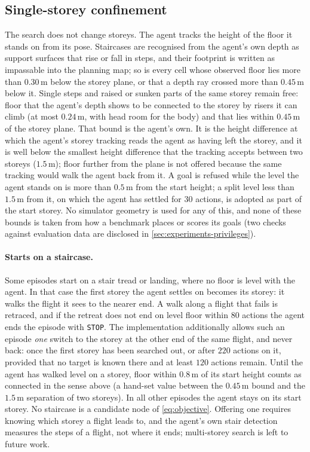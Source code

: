 \documentclass[10pt]{article}
\newcommand{\code}[1]{\texttt{#1}}
\newcommand{\m}{\,\mathrm{m}}
\begin{document}
\subsection{Single-storey confinement}\label{sec:storey}
The search does not change storeys. The agent tracks the height
of the floor it stands on from its pose. Staircases are recognised from the
agent's own depth as support surfaces that rise or fall in steps, and their
footprint is written as impassable into the planning map; so is every cell
whose observed floor lies more than $0.30\m$ below the storey plane, or that a
depth ray crossed more than $0.45\m$ below it. Single steps and raised or
sunken parts of the same storey remain free: floor that the agent's depth
shows to be connected to the storey by risers it can climb (at most
$0.24\m$, with head room for the body) and that lies within $0.45\m$ of the
storey plane. That bound is the agent's own. It is the height difference at
which the agent's storey tracking reads the agent as having left the storey,
and it is well below the smallest height difference that the tracking accepts
between two storeys ($1.5\m$); floor further from the plane is not offered
because the same tracking would walk the agent back from it. A goal is refused
while the level the agent stands on is more than $0.5\m$ from the start
height; a split level less than $1.5\m$ from it, on which the agent has
settled for $30$ actions, is adopted as part of the start storey.
No simulator geometry is used for any of this, and none of these bounds is
taken from how a benchmark places or scores its goals (two checks against
evaluation data are disclosed in \cref{sec:experiments-privileges}).

\paragraph{Starts on a staircase.} Some episodes start on a stair tread or
landing, where no floor is level with the agent. In that case the first storey
the agent settles on becomes its storey: it walks the flight it sees to the
nearer end. A walk along a flight that fails is retraced, and if the retreat
does not end on level floor within $80$ actions the agent ends the episode
with \code{STOP}. The implementation additionally allows such an episode \emph{one}
switch to the storey at the other end of the same flight, and never back: once
the first storey has been searched out, or after $220$ actions on it, provided
that no target is known there and at least $120$ actions remain. Until the
agent has walked level on a
storey, floor within $0.8\m$ of its start height counts as connected in the
sense above (a hand-set value between the $0.45\m$ bound and the $1.5\m$
separation of two storeys). In all other episodes the agent stays on
its start storey. No staircase is a candidate node of \cref{eq:objective}.
Offering one requires knowing which storey a flight leads to, and the agent's
own stair detection measures the steps of a flight, not where it ends;
multi-storey search is left to future work.
\end{document}
